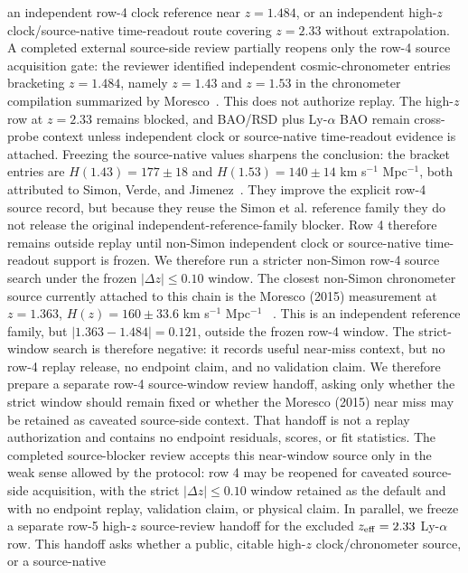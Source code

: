 \documentclass[11pt]{article}
\begin{document}
an independent row-4 clock reference near \(z=1.484\), or an independent
high-\(z\) clock/source-native time-readout route covering \(z=2.33\) without
extrapolation.
A completed external source-side review partially reopens only the row-4 source
acquisition gate: the reviewer identified independent cosmic-chronometer entries
bracketing \(z=1.484\), namely \(z=1.43\) and \(z=1.53\) in the chronometer
compilation summarized by Moresco~\cite{Moresco2023ChronometersReview}.  This
does not authorize replay.  The high-\(z\) row at \(z=2.33\) remains blocked,
and BAO/RSD plus Ly-\(\alpha\) BAO remain cross-probe context unless independent
clock or source-native time-readout evidence is attached.
Freezing the source-native values sharpens the conclusion: the bracket entries
are \(H(1.43)=177\pm18\) and \(H(1.53)=140\pm14\)
km s\(^{-1}\) Mpc\(^{-1}\), both attributed to Simon, Verde, and
Jimenez~\cite{Simon2005Chronometers}.  They improve the explicit row-4 source
record, but because they reuse the Simon et al. reference family they do not
release the original independent-reference-family blocker.  Row 4 therefore
remains outside replay until non-Simon independent clock or source-native
time-readout support is frozen.
We therefore run a stricter non-Simon row-4 source search under the frozen
\(|\Delta z|\le 0.10\) window.  The closest non-Simon chronometer source
currently attached to this chain is the Moresco (2015) measurement at
\(z=1.363\), \(H(z)=160\pm33.6\) km s\(^{-1}\) Mpc\(^{-1}\)
~\cite{Moresco2015RaisingBar}.  This is an independent reference family, but
\(|1.363-1.484|=0.121\), outside the frozen row-4 window.  The strict-window
search is therefore negative: it records useful near-miss context, but no
row-4 replay release, no endpoint claim, and no validation claim.
We therefore prepare a separate row-4 source-window review handoff, asking only
whether the strict window should remain fixed or whether the Moresco (2015)
near miss may be retained as caveated source-side context.  That handoff is not
a replay authorization and contains no endpoint residuals, scores, or fit
statistics.
The completed source-blocker review accepts this near-window source only in the
weak sense allowed by the protocol: row 4 may be reopened for caveated
source-side acquisition, with the strict \(|\Delta z|\le0.10\) window retained
as the default and with no endpoint replay, validation claim, or physical claim.
In parallel, we freeze a separate row-5 high-\(z\) source-review handoff for the
excluded \(z_{\rm eff}=2.33\) Ly-\(\alpha\) row.  This handoff asks whether a
public, citable high-\(z\) clock/chronometer source, or a source-native
\end{document}
